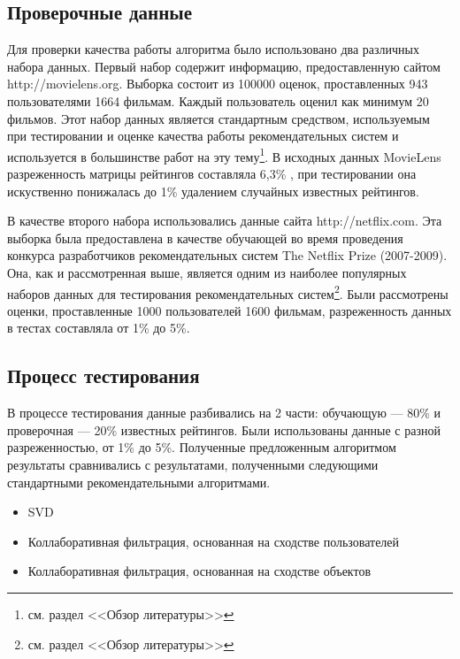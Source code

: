 \documentclass[a4paper, 12pt]{article} %
\begin{document}
\subsection{Проверочные данные}
Для проверки качества работы алгоритма было использовано два различных набора данных.  Первый набор содержит информацию, предоставленную сайтом \\ http://movielens.org. Выборка состоит из 100000 оценок, проставленных  943 пользователями 1664 фильмам. Каждый пользователь оценил как минимум 20 фильмов. Этот набор данных является стандартным средством, используемым при тестировании и оценке качества работы рекомендательных систем и используется в большинстве работ на эту тему\footnote{см. раздел <<Обзор литературы>>}. В исходных данных MovieLens разреженность матрицы рейтингов составляла 6,3\% , при тестировании она искуственно понижалась до 1\% удалением случайных известных рейтингов.
\par
В качестве второго набора использовались данные сайта http://netflix.com. Эта выборка была предоставлена в качестве обучающей во время проведения конкурса разработчиков рекомендательных систем The Netflix Prize\cite{netflix} (2007-2009). Она, как и рассмотренная выше, является одним из наиболее популярных наборов данных для тестирования рекомендательных систем\footnote{см. раздел <<Обзор литературы>>}. Были рассмотрены оценки, проставленные 1000 пользователей 1600 фильмам, разреженность данных в тестах составляла от 1\% до 5\%. 


\subsection{Процесс тестирования}
В процессе тестирования данные разбивались на 2 части: обучающую --- 80\% и проверочная --- 20\% известных рейтингов. Были использованы данные с разной разреженностью, от 1\% до 5\%. Полученные предложенным алгоритмом результаты сравнивались с результатами, полученными следующими стандартными рекомендательными алгоритмами.
\begin{itemize}
\item SVD
\item Коллаборативная фильтрация, основанная на сходстве пользователей
\item Коллаборативная фильтрация, основанная на сходстве объектов
\end{itemize}
\end{document}
